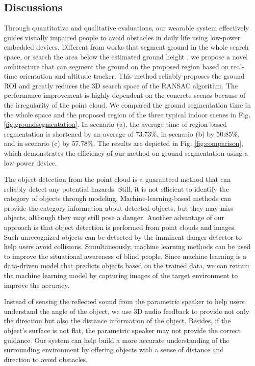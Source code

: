 \documentclass{ieeeaccess}
\begin{document}
\subsection{Discussions}

Through quantitative and qualitative evaluations, our wearable system effectively guides visually impaired people to avoid obstacles in daily life using low-power embedded devices. 
Different from works \cite{IEEEexample:takizawa2019kinect} \cite{IEEEexample:yang2016expanding} that segment ground in the whole search space, or search the area below the estimated ground height \cite{IEEEexample:bai2019wearable}, we propose a novel architecture that can segment the ground on the proposed region based on real-time orientation and altitude tracker. This method reliably proposes the ground ROI and greatly reduces the 3D search space of the RANSAC algorithm. The performance improvement is highly dependent on the concrete scenes because of the irregularity of the point cloud. We compared the ground segmentation time in the whole space and the proposed region of the three typical indoor scenes in Fig.\ref{fig:groundsegmentation}. In scenario (a), the average time of region-based segmentation is shortened by an average of 73.73\%, in scenario (b) by 50.85\%, and in scenario (c) by 57.78\%. The results are depicted in Fig. \ref{fig:comparison}, which demonstrates the efficiency of our method on ground segmentation using a low power device.

The object detection from the point cloud is a guaranteed method that can reliably detect any potential hazards. Still, it is not efficient to identify the category of objects through modeling. Machine-learning-based methods can provide the category information about detected objects, but they may miss objects, although they may still pose a danger. Another advantage of our approach is that object detection is performed from point clouds and images. Such unrecognized objects can be detected by the imminent  danger detector to help users avoid collisions. Simultaneously, machine learning methods can be used to improve the situational awareness of blind people. Since machine learning is 
a data-driven model that predicts objects based on the trained data, we can retrain the machine learning model by capturing images of the target environment to improve the accuracy. 

Instead of sensing the reflected sound from the parametric speaker \cite{IEEEexample:takizawa2019kinect} to help users understand the angle of the object, we use 3D audio feedback to provide not only the direction but also the distance information of the object. Besides, if the object's surface is not flat, the parametric speaker may not provide the correct guidance. Our system can help build a more accurate understanding of the surrounding environment by offering objects with a sense of distance and direction to avoid obstacles.
\end{document}

